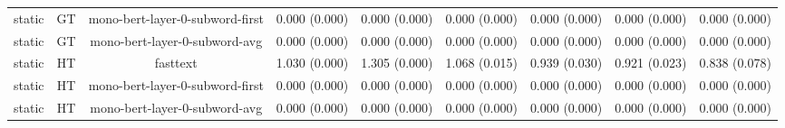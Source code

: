 \begin{sidewaystable}[htb]
\begin{tabular}{@{}ccccccccc@{}}
        static & GT & mono-bert-layer-0-subword-first & 0.000 (0.000) & 0.000 (0.000) & 0.000 (0.000) & 0.000 (0.000) & 0.000 (0.000) & 0.000 (0.000) \\
        static & GT & mono-bert-layer-0-subword-avg & 0.000 (0.000) & 0.000 (0.000) & 0.000 (0.000) & 0.000 (0.000) & 0.000 (0.000) & 0.000 (0.000) \\
        static & HT & fasttext & 1.030 (0.000) & 1.305 (0.000) & 1.068 (0.015) & 0.939 (0.030) & 0.921 (0.023) & 0.838 (0.078) \\
        static & HT & mono-bert-layer-0-subword-first & 0.000 (0.000) & 0.000 (0.000) & 0.000 (0.000) & 0.000 (0.000) & 0.000 (0.000) & 0.000 (0.000) \\
        static & HT & mono-bert-layer-0-subword-avg & 0.000 (0.000) & 0.000 (0.000) & 0.000 (0.000) & 0.000 (0.000) & 0.000 (0.000) & 0.000 (0.000) \\
        \bottomrule
    \end{tabular}
\end{sidewaystable}
